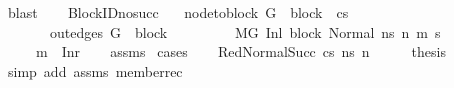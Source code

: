 \begin{isabellebody}
\ blast\isanewline
\ \ \isamarkupfalse%
\isanewline
{}\isamarkupfalse%
\isanewline
{}\isamarkupfalse%
%
\endisatagproof
{\isafoldproof}%
%
\isadelimproof
\isanewline
%
\endisadelimproof
\isanewline
{}\isamarkupfalse%
\ BlockID{\isacharunderscore}{\kern0pt}no{\isacharunderscore}{\kern0pt}succ{\isacharcolon}{\kern0pt}\isanewline
\ \ \ {\isachardoublequoteopen}node{\isacharunderscore}{\kern0pt}to{\isacharunderscore}{\kern0pt}block\ G\ {\isacharbang}{\kern0pt}\ block\ {\isacharequal}{\kern0pt}\ cs{\isachardoublequoteclose}\isanewline
\ \ \ \ \ \ \ {\isachardoublequoteopen}out{\isacharunderscore}{\kern0pt}edges\ G\ {\isacharbang}{\kern0pt}\ block\ {\isacharequal}{\kern0pt}\ {\isacharbrackleft}{\kern0pt}{\isacharbrackright}{\kern0pt}{\isachardoublequoteclose}\isanewline
\ \ \ \ \ \ \ {\isachardoublequoteopen}M{\isacharcomma}{\kern0pt}{\isasymLambda}{\isacharcomma}{\kern0pt}{\isasymGamma}{\isacharcomma}{\kern0pt}{\isasymOmega}{\isacharcomma}{\kern0pt}G\ {\isasymturnstile}{\isacharparenleft}{\kern0pt}Inl\ block{\isacharcomma}{\kern0pt}\ Normal\ ns{\isacharparenright}{\kern0pt}\ {\isacharminus}{\kern0pt}n{\isasymrightarrow}\ {\isacharparenleft}{\kern0pt}m{\isacharprime}{\kern0pt}{\isacharcomma}{\kern0pt}\ s{\isacharprime}{\kern0pt}{\isacharparenright}{\kern0pt}{\isachardoublequoteclose}\isanewline
\ \ \ \ \ {\isachardoublequoteopen}m{\isacharprime}{\kern0pt}\ {\isacharequal}{\kern0pt}\ Inr{\isacharparenleft}{\kern0pt}{\isacharparenright}{\kern0pt}{\isachardoublequoteclose}\isanewline
%
\isadelimproof
\ \ %
\endisadelimproof
%
\isatagproof
{}\isamarkupfalse%
\ assms{\isacharparenleft}{\kern0pt}{}{\isacharparenright}{\kern0pt}\isanewline
{}\isamarkupfalse%
\ cases\isanewline
\ \ \isamarkupfalse%
\ {\isacharparenleft}{\kern0pt}RedNormalSucc\ cs\ ns{\isacharprime}{\kern0pt}\ n{\isacharprime}{\kern0pt}{\isacharparenright}{\kern0pt}\isanewline
\ \ \isamarkupfalse%
\ \isamarkupfalse%
\ {\isacharquery}{\kern0pt}thesis\isanewline
\ \ \ \ \isamarkupfalse%
\ {\isacharparenleft}{\kern0pt}simp\ add{\isacharcolon}{\kern0pt}\ assms{\isacharparenleft}{\kern0pt}{}{\isacharparenright}{\kern0pt}\ member{\isacharunderscore}{\kern0pt}rec{\isacharparenleft}{\kern0pt}{}{\isacharparenright}{\kern0pt}{\isacharparenright}{\kern0pt}\isanewline
{}\isamarkupfalse%
\isanewline

\end{isabellebody}
